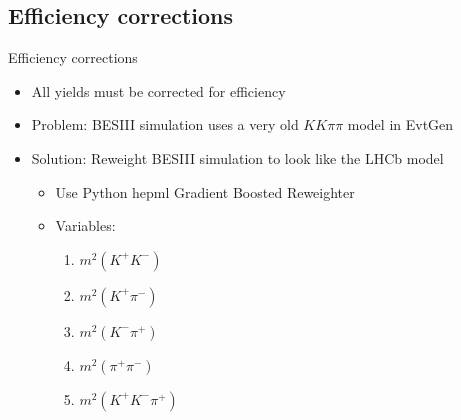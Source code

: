 \documentclass{beamer}
\begin{document}
\subsection{Efficiency corrections}

\begin{frame}{Efficiency corrections}
  \begin{itemize}
    \setlength\itemsep{1.5em}
    \item{All yields must be corrected for efficiency}
    \item{Problem: BESIII simulation uses a very old $KK\pi\pi$ model in EvtGen}
    \item{Solution: Reweight BESIII simulation to look like the LHCb model}
    \begin{itemize}
      \setlength\itemsep{0.5em}
      \item{Use Python hep\textunderscore ml Gradient Boosted Reweighter}
      \item{Variables:}
      \begin{enumerate}
        \item{$m^2(K^+K^-)$}
        \item{$m^2(K^+\pi^-)$}
        \item{$m^2(K^-\pi^+)$}
        \item{$m^2(\pi^+\pi^-)$}
        \item{$m^2(K^+K^-\pi^+)$}
      \end{enumerate}
    \end{itemize}
  \end{itemize}
\end{frame}
\end{document}
